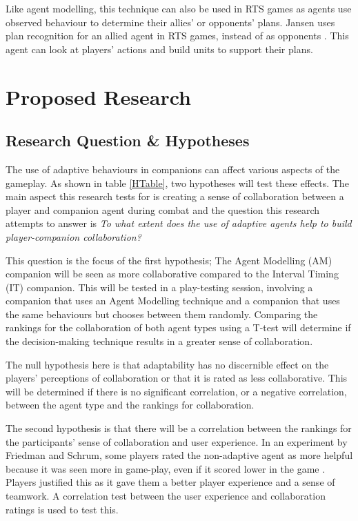 \documentclass{IEEEtran}
\begin{document}
Like agent modelling, this technique can also be used in RTS games as agents use observed behaviour to determine their allies' or opponents' plans. Jansen uses plan recognition for an allied agent in RTS games, instead of as opponents \cite{PlayerAdaptiveRTSAI2007}. This agent can look at players' actions and build units to support their plans.

\section{Proposed Research}
\label{ProposedResearch}

\subsection{Research Question \& Hypotheses}
\label{Hypotheses}


The use of adaptive behaviours in companions can affect various aspects of the gameplay. As shown in table \ref{HTable}, two hypotheses will test these effects. The main aspect this research tests for is creating a sense of collaboration between a player and companion agent during combat and the question this research attempts to answer is \textit{To what extent does the use of adaptive agents help to build player-companion collaboration?}

This question is the focus of the first hypothesis; The Agent Modelling (AM) companion will be seen as more collaborative compared to the Interval Timing (IT) companion. This will be tested in a play-testing session, involving a companion that uses an Agent Modelling technique and a companion that uses the same behaviours but chooses between them randomly. Comparing the rankings for the collaboration of both agent types using a T-test will determine if the decision-making technique results in a greater sense of collaboration.

The null hypothesis here is that adaptability has no discernible effect on the players' perceptions of collaboration or that it is rated as less collaborative. This will be determined if there is no significant correlation, or a negative correlation, between the agent type and the rankings for collaboration.

The second hypothesis is that there will be a correlation between the rankings for the participants’ sense of collaboration and user experience. In an experiment by Friedman and Schrum, some players rated the non-adaptive agent as more helpful because it was seen more in game-play, even if it scored lower in the game \cite{CompanionBotsFPS2019}. Players justified this as it gave them a better player experience and a sense of teamwork. A correlation test between the user experience and collaboration ratings is used to test this.
\end{document}
